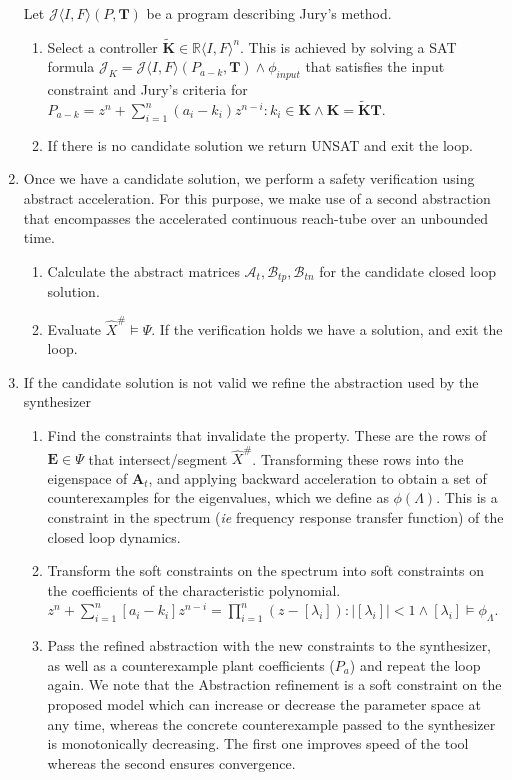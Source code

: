 \documentclass[runningheads,a4paper]{llncs}
\newcommand{\mat}[1]{\boldsymbol{#1}}
\begin{document}
\begin{enumerate}
Let $\mathcal{J}\langle I,F \rangle (P,\mat{T})$ be a program describing Jury's method.
\begin{enumerate}
\item Select a controller $\tilde{\mat{K}} \in \mathbb{R}\langle I,F\rangle^n$. This is achieved by solving a SAT formula $\mathcal{J}_K=\mathcal{J}\langle I,F \rangle (P_{a-k},\mat{T})\wedge \phi_{input}$ that satisfies the input constraint and Jury's criteria for $P_{a-k}=z^n+\sum_{i=1}^n (a_i-k_i) z^{n-i} : k_i \in \mat{K} \wedge \mat{K}=\tilde{\mat{K}}\mat{T}$.
\item If there is no candidate solution we return UNSAT and exit the loop.
\end{enumerate}
\item Once we have a candidate solution, we perform a safety verification using abstract acceleration. For this purpose, we make use of a second abstraction that encompasses the accelerated continuous reach-tube over an unbounded time. %

\begin{enumerate}
\item Calculate the abstract matrices $\mathcal{A}_t, \mathcal{B}_{tp},\mathcal{B}_{tn}$ for the candidate closed loop solution.
\item Evaluate $\hat{X}^\# \models \Psi$. If the verification holds we have a solution, and exit the loop.
\end{enumerate} 
\item If the candidate solution is not valid we refine the abstraction used by the synthesizer
\begin{enumerate}
\item Find the constraints that invalidate the property. These are the rows of $\mat{E} \in \Psi$ that intersect/segment $\hat{X}^\#$. Transforming these rows into the eigenspace of $\mat{A}_t$, and applying backward acceleration to obtain a set of counterexamples for the eigenvalues, which we define as $\phi(\Lambda)$. This is a constraint in the spectrum (\emph{ie} frequency response transfer function) of the closed loop dynamics. 
\item Transform the soft constraints on the spectrum into soft constraints on the coefficients of the characteristic polynomial. 
$z^n+\sum_{i=1}^n[a_i-k_i]z^{n-i}=\prod_{i=1}^n (z-[\lambda_i]) : |[\lambda_i]|<1 \wedge [\lambda_i] \models \phi_{\Lambda}$.
\item Pass the refined abstraction with the new constraints to the synthesizer, as well as a counterexample plant coefficients ($P_a$) and repeat the loop again. We note that the Abstraction refinement is a soft constraint on the proposed model which can increase or decrease the parameter space at any time, whereas the concrete counterexample passed to the synthesizer is monotonically decreasing. The first one improves speed of the tool whereas the second ensures convergence.

\end{enumerate} 
\end{enumerate}
\end{document}
